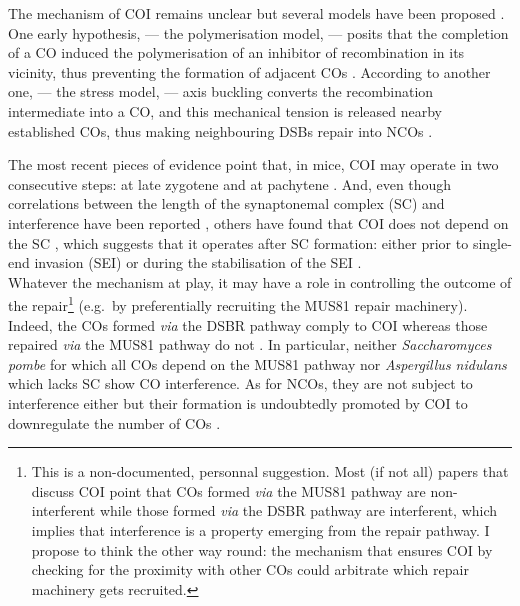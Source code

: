 The mechanism of COI remains unclear but several models have been proposed \citep[reviewed in][]{youds2011choice}.
One early hypothesis, — the polymerisation model, — posits that the completion of a CO induced the polymerisation of an inhibitor of recombination in its vicinity, thus preventing the formation of adjacent COs \citep{maguire1988crossover,king1990polymerization}.
According to another one, — the stress model, — axis buckling converts the recombination intermediate into a CO, and this mechanical tension is released nearby established COs, thus making neighbouring DSBs repair into NCOs \citep{borner2004crossover,kleckner2004mechanical}.

The most recent pieces of evidence point that, in mice, COI may operate in two consecutive steps: at late zygotene and at pachytene \citep{boer2006two}.
And, even though correlations between the length of the synaptonemal complex (SC) and interference have been reported \citep{sym1994crossover,lynn2002covariation,petkov2007crossover}, others have found that COI does not depend on the SC \citep{deboer2007meiotic,shodhan2014msh4}, which suggests that it operates after SC formation: either prior to single-end invasion (SEI) \citep{hunter2001singleend, bishop2004early} or during the stabilisation of the SEI \citep{shinohara2008crossover}.\\

Whatever the mechanism at play, it may have a role in controlling the outcome of the repair\footnote{This is a non-documented, personnal suggestion. Most (if not all) papers that discuss COI point that COs formed \textit{via} the MUS81 pathway are non-interferent while those formed \textit{via} the DSBR pathway are interferent, which implies that interference is a property emerging from the repair pathway. I propose to think the other way round: the mechanism that ensures COI by checking for the proximity with other COs could arbitrate which repair machinery gets recruited.} (e.g.\ by preferentially recruiting the MUS81 repair machinery).
Indeed, the COs formed \textit{via} the DSBR pathway comply to COI whereas those repaired \textit{via} the MUS81 pathway do not \citep{santos2003mus81,kohl2013meiotic}.
In particular, neither \textit{Saccharomyces pombe} for which all COs depend on the MUS81 pathway \citep{munz1994analysis,hollingsworth2004mus81,cromie2006single} nor \textit{Aspergillus nidulans} which lacks SC \citep[reviewed in \citealp{shaw1998meiosis} and \citealp{egel1995synaptonemal}]{strickland1958analysis} show CO interference.
As for NCOs, they are not subject to interference either \citep{malkova2004gene,baudat2007regulating,miller2016wholegenome} but their formation is undoubtedly promoted by COI to downregulate the number of COs \citep{youds2010rtel1}.

